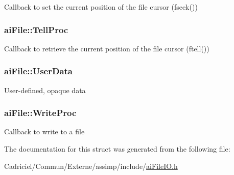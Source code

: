 Callback to set the current position of the file cursor (fseek()) \hypertarget{structai_file_aaf2d88a3b2fcbdacf51119658283d27e}{
\subsubsection[{Tell\-Proc}]{ ai\-File\-::\-Tell\-Proc}}\label{structai_file_aaf2d88a3b2fcbdacf51119658283d27e}
Callback to retrieve the current position of the file cursor (ftell()) \hypertarget{structai_file_aec528fa18f4755fe4f28d604fde28aad}{
\subsubsection[{User\-Data}]{ ai\-File\-::\-User\-Data}}\label{structai_file_aec528fa18f4755fe4f28d604fde28aad}
User-\/defined, opaque data \hypertarget{structai_file_ab9fca3a62e34a33592c13a6f31db7d1d}{
\subsubsection[{Write\-Proc}]{ ai\-File\-::\-Write\-Proc}}\label{structai_file_ab9fca3a62e34a33592c13a6f31db7d1d}
Callback to write to a file 

The documentation for this struct was generated from the following file\-:\begin{DoxyCompactItemize}
\item 
Cadriciel/\-Commun/\-Externe/assimp/include/\hyperlink{ai_file_i_o_8h}{ai\-File\-I\-O.\-h}\end{DoxyCompactItemize}
